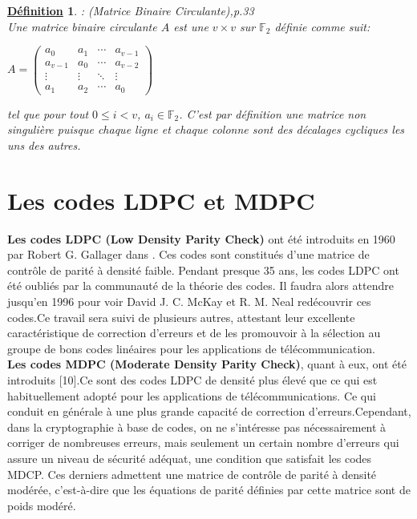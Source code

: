 \documentclass[12pt,openany]{report}
\newtheorem{definition}{\underline{Définition}}
\begin{document}
\begin{definition}: (Matrice Binaire Circulante)\cite{baldi2014},p.33\\
Une matrice binaire circulante $\mathit{A}$ est une $v\times v$ sur $\mathbb{F}_2$ définie comme suit:

\begin{center}

$\mathit{A}=\begin{pmatrix}
a_0 & a_1 & \cdots & a_{v-1} \\
a_{v-1} & a_0 & \cdots & a_{v-2} \\
\vdots & \vdots & \ddots & \vdots \\
a_1 & a_2 & \cdots & a_0
\end{pmatrix}$

\end{center}

tel que pour tout $0\leq i < v$, $a_i \in \mathbb{F}_2$. C'est par définition une matrice non singulière puisque
chaque ligne et chaque colonne sont des décalages cycliques les uns des autres.
\end{definition}




\section{Les codes LDPC et   MDPC}

\textbf{Les codes LDPC (Low Density Parity Check)} ont été introduits en 1960 par Robert G. Gallager dans \cite{R_G_Gallager}. Ces codes sont constitués d'une matrice de contrôle de parité à densité faible. Pendant presque 35 ans, les codes LDPC ont été oubliés par la communauté de la théorie des codes. Il faudra alors attendre jusqu'en 1996 pour voir David J. C. McKay et R. M. Neal redécouvrir ces codes.Ce travail sera suivi de plusieurs autres, attestant leur excellente caractéristique de correction d'erreurs et de les promouvoir à la sélection au groupe de bons codes linéaires pour les applications de télécommunication.\\
\textbf{
Les codes MDPC (Moderate Density Parity Check)}, quant à eux, ont été introduits [10].Ce sont des codes LDPC de densité plus élevé que ce qui est habituellement adopté pour les applications de télécommunications. Ce qui conduit en générale à une plus grande capacité de correction d'erreurs.Cependant, dans la cryptographie à base de codes, on ne s'intéresse pas nécessairement à corriger de nombreuses erreurs, mais seulement un certain nombre d'erreurs qui assure un niveau de sécurité adéquat, une condition que satisfait les codes MDCP. Ces derniers admettent une matrice de contrôle de parité à densité modérée, c'est-à-dire que les équations de parité définies par cette matrice sont de poids modéré.
\end{document}
